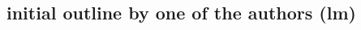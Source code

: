 \documentclass[10pt, letterpaper]{article}
\begin{document}
\begin{spacing}{1.4}


\section{initial outline by one of the authors (lm)}



\end{spacing}
\end{document}
